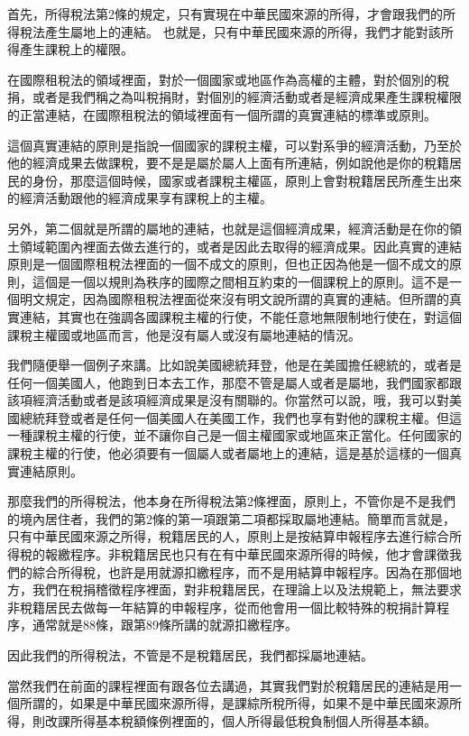 \documentclass[]{ctexbook}
\begin{document}
首先，所得稅法第2條的規定，只有實現在中華民國來源的所得，才會跟我們的所得稅法產生屬地上的連結。
也就是，只有中華民國來源的所得，我們才能對該所得產生課稅上的權限。

在國際租稅法的領域裡面，對於一個國家或地區作為高權的主體，對於個別的稅捐，或者是我們稱之為叫稅捐財，對個別的經濟活動或者是經濟成果產生課稅權限的正當連結，在國際租稅法的領域裡面有一個所謂的真實連結的標準或原則。

這個真實連結的原則是指說一個國家的課稅主權，可以對系爭的經濟活動，乃至於他的經濟成果去做課稅，要不是是屬於屬人上面有所連結，例如說他是你的稅籍居民的身份，那麼這個時候，國家或者課稅主權區，原則上會對稅籍居民所產生出來的經濟活動跟他的經濟成果享有課稅上的主權。

另外，第二個就是所謂的屬地的連結，也就是這個經濟成果，經濟活動是在你的領土領域範圍內裡面去做去進行的，或者是因此去取得的經濟成果。因此真實的連結原則是一個國際租稅法裡面的一個不成文的原則，但也正因為他是一個不成文的原則，這個是一個以規則為秩序的國際之間相互約束的一個課稅上的原則。這不是一個明文規定，因為國際租稅法裡面從來沒有明文說所謂的真實的連結。但所謂的真實連結，其實也在強調各國課稅主權的行使，不能任意地無限制地行使在，對這個課稅主權國或地區而言，他是沒有屬人或沒有屬地連結的情況。

我們隨便舉一個例子來講。比如說美國總統拜登，他是在美國擔任總統的，或者是任何一個美國人，他跑到日本去工作，那麼不管是屬人或者是屬地，我們國家都跟該項經濟活動或者是該項經濟成果是沒有關聯的。你當然可以說，哦，我可以對美國總統拜登或者是任何一個美國人在美國工作，我們也享有對他的課稅主權。但這一種課稅主權的行使，並不讓你自己是一個主權國家或地區來正當化。任何國家的課稅主權的行使，他必須要有一個屬人或者屬地上的連結，這是基於這樣的一個真實連結原則。

那麼我們的所得稅法，他本身在所得稅法第2條裡面，原則上，不管你是不是我們的境內居住者，我們的第2條的第一項跟第二項都採取屬地連結。簡單而言就是，只有中華民國來源之所得，稅籍居民的人，原則上是按結算申報程序去進行綜合所得稅的報繳程序。非稅籍居民也只有在有中華民國來源所得的時候，他才會課徵我們的綜合所得稅，也許是用就源扣繳程序，而不是用結算申報程序。因為在那個地方，我們在稅捐稽徵程序裡面，對非稅籍居民，在理論上以及法規範上，無法要求非稅籍居民去做每一年結算的申報程序，從而他會用一個比較特殊的稅捐計算程序，通常就是88條，跟第89條所講的就源扣繳程序。

因此我們的所得稅法，不管是不是稅籍居民，我們都採屬地連結。

當然我們在前面的課程裡面有跟各位去講過，其實我們對於稅籍居民的連結是用一個所謂的，如果是中華民國來源所得，是課綜所稅所得，如果不是中華民國來源所得，則改課所得基本稅額條例裡面的，個人所得最低稅負制個人所得基本額。
\end{document}
